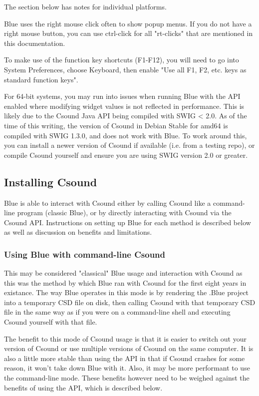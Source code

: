 The section below has notes for individual platforms.

Blue uses the right mouse click often to show popup menus. If you do not
have a right mouse button, you can use ctrl-click for all "rt-clicks"
that are mentioned in this documentation.

To make use of the function key shortcuts (F1-F12), you will need to go
into System Preferences, choose Keyboard, then enable "Use all F1, F2,
etc. keys as standard function keys".

For 64-bit systems, you may run into issues when running Blue with the
API enabled where modifying widget values is not reflected in
performance. This is likely due to the Csound Java API being compiled
with SWIG \textless{} 2.0. As of the time of this writing, the version
of Csound in Debian Stable for amd64 is compiled with SWIG 1.3.0, and
does not work with Blue. To work around this, you can install a newer
version of Csound if available (i.e. from a testing repo), or compile
Csound yourself and ensure you are using SWIG version 2.0 or greater.

\subsection{Installing Csound}\label{installingCsound}

Blue is able to interact with Csound either by calling Csound like a
command-line program (classic Blue), or by directly interacting with
Csound via the Csound API. Instructions on setting up Blue for each
method is described below as well as discussion on benefits and
limitations.

\subsubsection{Using Blue with command-line
Csound}\label{commandLineCsound}

This may be considered "classical" Blue usage and interaction with
Csound as this was the method by which Blue ran with Csound for the
first eight years in existance. The way Blue operates in this mode is by
rendering the .Blue project into a temporary CSD file on disk, then
calling Csound with that temporary CSD file in the same way as if you
were on a command-line shell and executing Csound yourself with that
file.

The benefit to this mode of Csound usage is that it is easier to switch
out your version of Csound or use multiple versions of Csound on the
same computer. It is also a little more stable than using the API in
that if Csound crashes for some reason, it won't take down Blue with it.
Also, it may be more performant to use the command-line mode. These
benefits however need to be weighed against the benefits of using the
API, which is described below.

